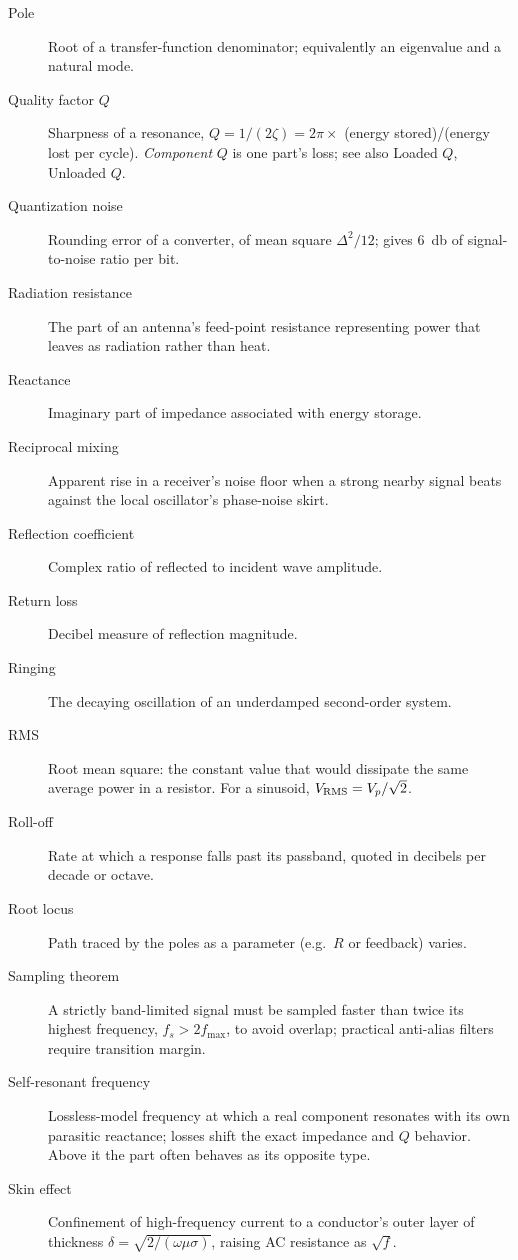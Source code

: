 \begin{description}
\item[Pole] Root of a transfer-function denominator; equivalently an eigenvalue and a natural mode.
\item[Quality factor \(Q\)] Sharpness of a resonance, \(Q=1/(2\zeta)=2\pi\times\) (energy stored)/(energy lost per cycle). \emph{Component} \(Q\) is one part's loss; see also Loaded \(Q\), Unloaded \(Q\).
\item[Quantization noise] Rounding error of a converter, of mean square \(\Delta^2/12\); gives \SI{6}{\decibel} of signal-to-noise ratio per bit.
\item[Radiation resistance] The part of an antenna's feed-point resistance representing power that leaves as radiation rather than heat.
\item[Reactance] Imaginary part of impedance associated with energy storage.
\item[Reciprocal mixing] Apparent rise in a receiver's noise floor when a strong nearby signal beats against the local oscillator's phase-noise skirt.
\item[Reflection coefficient] Complex ratio of reflected to incident wave amplitude.
\item[Return loss] Decibel measure of reflection magnitude.
\item[Ringing] The decaying oscillation of an underdamped second-order system.
\item[RMS] Root mean square: the constant value that would dissipate the same average power in a resistor. For a sinusoid, \(V_{\mathrm{RMS}}=V_p/\sqrt2\).
\item[Roll-off] Rate at which a response falls past its passband, quoted in decibels per decade or octave.
\item[Root locus] Path traced by the poles as a parameter (e.g.\ \(R\) or feedback) varies.
\item[Sampling theorem] A strictly band-limited signal must be sampled faster than twice its highest frequency, \(f_s>2f_{\max}\), to avoid overlap; practical anti-alias filters require transition margin.
\item[Self-resonant frequency] Lossless-model frequency at which a real component resonates with its own parasitic reactance; losses shift the exact impedance and \(Q\) behavior. Above it the part often behaves as its opposite type.
\item[Skin effect] Confinement of high-frequency current to a conductor's outer layer of thickness \(\delta=\sqrt{2/(\omega\mu\sigma)}\), raising AC resistance as \(\sqrt f\).

\end{description}
